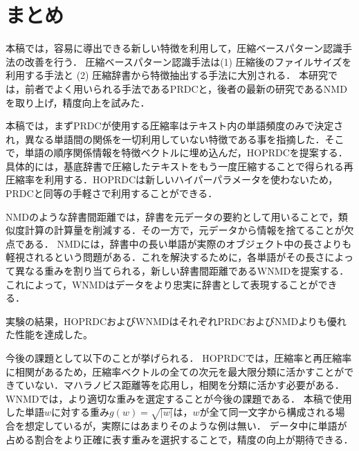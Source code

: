 \chapter{まとめ}
本稿では，容易に導出できる新しい特徴を利用して，圧縮ベースパターン認識手法の改善を行う．
圧縮ベースパターン認識手法は(1) 圧縮後のファイルサイズを利用する手法と (2) 圧縮辞書から特徴抽出する手法に大別される．
本研究では，前者でよく用いられる手法であるPRDCと，後者の最新の研究であるNMDを取り上げ，精度向上を試みた．

本稿では，まずPRDCが使用する圧縮率はテキスト内の単語頻度のみで決定され，異なる単語間の関係を一切利用していない特徴である事を指摘した．そこで，単語の順序関係情報を特徴ベクトルに埋め込んだ，HOPRDCを提案する．具体的には，基底辞書で圧縮したテキストをもう一度圧縮することで得られる再圧縮率を利用する．HOPRDCは新しいハイパーパラメータを使わないため，PRDCと同等の手軽さで利用することができる．


NMDのような辞書間距離では，辞書を元データの要約として用いることで，類似度計算の計算量を削減する．その一方で，元データから情報を捨てることが欠点である．
NMDには，辞書中の長い単語が実際のオブジェクト中の長さよりも軽視されるという問題がある．これを解決するために，各単語がその長さによって異なる重みを割り当てられる，新しい辞書間距離であるWNMDを提案する．これによって，WNMDはデータをより忠実に辞書として表現することができる．

実験の結果，HOPRDCおよびWNMDはそれぞれPRDCおよびNMDよりも優れた性能を達成した。

今後の課題として以下のことが挙げられる．
HOPRDCでは，圧縮率と再圧縮率に相関があるため，圧縮率ベクトルの全ての次元を最大限分類に活かすことができていない．マハラノビス距離等を応用し，相関を分類に活かす必要がある．
WNMDでは，より適切な重みを選定することが今後の課題である．
本稿で使用した単語$w$に対する重み$g(w)=\sqrt{|w|}$は，$w$が全て同一文字から構成される場合を想定しているが，実際にはあまりそのような例は無い．
データ中に単語が占める割合をより正確に表す重みを選択することで，精度の向上が期待できる．

